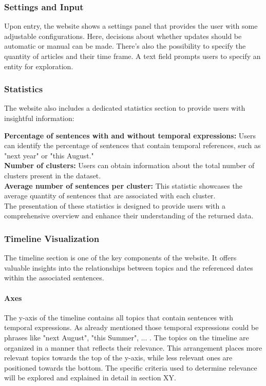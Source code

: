 \documentclass[a4paper,10pt]{report} %
\begin{document}
\subsubsection{Settings and Input}
Upon entry, the website shows a settings panel that provides the user with some adjustable configurations. Here, decisions about whether updates should be automatic or manual can be made. There’s also the possibility to specify the quantity of articles and their time frame. A text field prompts users to specify an entity for exploration.

\subsubsection{Statistics}
The website also includes a dedicated statistics section to provide users with insightful information:

\textbf{Percentage of sentences with and without temporal expressions:} Users can identify the percentage of sentences that contain temporal references, such as "next year" or "this August." \\
\textbf{Number of clusters:} Users can obtain information about the total number of clusters present in the dataset. \\
\textbf{Average number of sentences per cluster:} This statistic showcases the average quantity of sentences that are associated with each cluster. \\
The presentation of these statistics is designed to provide users with a comprehensive overview and enhance their understanding of the returned data.

\subsubsection{Timeline Visualization}
 The timeline section is one of the key components of the website. It offers valuable insights into the relationships between topics and the referenced dates within the associated sentences.

\paragraph{Axes}
The y-axis of the timeline contains all topics that contain sentences with temporal expressions. As already mentioned those temporal expressions could be phrases like "next August", "this Summer", ... . The topics on the timeline are organized in a manner that reflects their relevance. This arrangement places more relevant topics towards the top of the y-axis, while less relevant ones are positioned towards the bottom. The specific criteria used to determine relevance will be explored and explained in detail in section XY.
\end{document}

